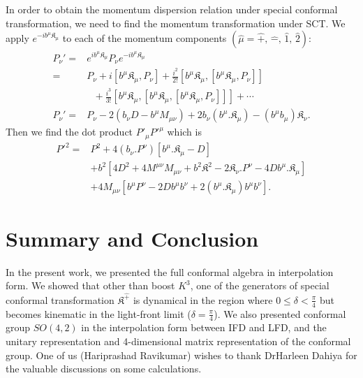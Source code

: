 \documentclass[aps,reprint,notitlepage,nofootinbib,superscriptaddress]{revtex4-1}
\def\wh{\widehat}
\begin{document}
In order to obtain the momentum dispersion relation under special conformal transformation, we need to find the momentum transformation under SCT. We apply $e^{-ib^{\mu} \mathfrak{K}_{\mu}}$ to each of the momentum components $(\wh{\mu} = \wh+,\,\wh- ,\, \wh1,\, \wh2)$:
\begin{align}
{P}_{{\nu}}' = & e^{ib^{\mu} \mathfrak{K}_{\mu}} {P}_{{\nu}} e^{-ib^{\mu} \mathfrak{K}_{\mu} } \\
 = & {P}_{{\nu}} + i\left[b^{\mu} \mathfrak{K}_{\mu}, {P}_{{\nu}} \right] + \frac{i^2}{2!}\left[b^{\mu} \mathfrak{K}_{\mu}, \left[b^{\mu} \mathfrak{K}_{\mu}, {P}_{{\nu}} \right]\right]\nonumber\\
 &~~~+ \frac{i^3}{3!}\left[b^{\mu} \mathfrak{K}_{\mu},\left[b^{\mu} \mathfrak{K}_{\mu}, \left[b^{\mu} \mathfrak{K}_{\mu}, {P}_{{\nu}} \right]\right] \right] + \cdots\\
 {P}_{{\nu}}' = & {P}_{{\nu}} -2 \left(b_\nu D-b^\mu M_{{\mu}{\nu}}\right)+2 b_{\nu}(b^{\mu}.\mathfrak{K}_{\mu})-(b^\mu b_{\mu})\mathfrak{K}_{{\nu}}.
\end{align}
Then we find the dot product $P'_\mu P'^\mu$ which is
\begin{align}
     P'^2=&P^2 +4(b_\nu.{P}^{{\nu}})\left[b^{\mu}.\mathfrak{K}_{\mu}-D\right]\nonumber\\
    &+b^2\left[4D^2+4 M^{{\mu}{\nu}} M_{{\mu}{\nu}}+b^2\mathfrak{K}^2-2\mathfrak{K}_{{\nu}}.{P}^{{\nu}}-4D b^{\mu}.\mathfrak{K}_{\mu}\right]\nonumber\\
    &+4M_{\mu\nu}\left[b^\mu {P}^{{\nu}}-2Db^\mu b^\nu+2(b^{\mu}.\mathfrak{K}_{\mu})b^\mu b^\nu\right].
\end{align}
\section{Summary and Conclusion}
In the present work, we presented the full conformal algebra in interpolation form. We showed that other than boost $K^{3}$, one of the generators of special conformal transformation $\mathfrak{K}^{\hat{+}}$ is dynamical in the region where $0\leq\delta<\frac{\pi}{4}$ but becomes kinematic in the light-front limit ($\delta=\frac{\pi}{4}$). We also presented conformal group $SO(4,2)$ in the interpolation form between IFD and LFD, and the unitary representation and 4-dimensional matrix representation of the conformal group.
\acknowledgments
One of us (Hariprashad Ravikumar) wishes to thank Dr\@ Harleen Dahiya for the valuable discussions on some calculations. 
\appendix
\end{document}
